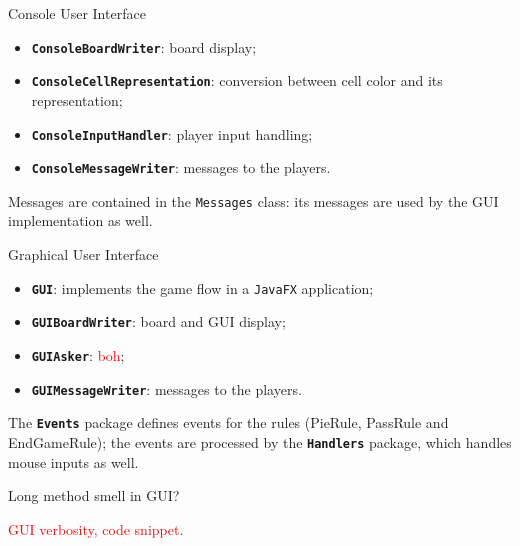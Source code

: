 \documentclass{beamer}
\begin{document}
  \begin{frame}{Console User Interface}

    \begin{itemize}
      \setlength\itemsep{1em}
      \item \textbf{\texttt{ConsoleBoardWriter}}: board display;
      \item \textbf{\texttt{ConsoleCellRepresentation}}: conversion between cell color and its representation;
      \item \textbf{\texttt{ConsoleInputHandler}}: player input handling;
      \item \textbf{\texttt{ConsoleMessageWriter}}: messages to the players.
    \end{itemize}

    \vspace{1em}

    Messages are contained in the \texttt{Messages} class: its messages are used by the GUI implementation as well.


  \end{frame}



  \begin{frame}{Graphical User Interface}

    \begin{itemize}
      \setlength\itemsep{1em}
      \item \textbf{\texttt{GUI}}: implements the game flow in a \texttt{JavaFX} application;
      \item \textbf{\texttt{GUIBoardWriter}}: board and GUI display;
      \item \textbf{\texttt{GUIAsker}}: \textcolor{red}{boh};
      \item \textbf{\texttt{GUIMessageWriter}}: messages to the players.
    \end{itemize}

    \vspace{1em}

    The \textbf{\texttt{Events}} package defines events for the rules (PieRule, PassRule and EndGameRule); the events are processed by the \textbf{\texttt{Handlers}} package, which handles mouse inputs as well.


  \end{frame}


  \begin{frame}{Long method smell in GUI?}

    \textcolor{red}{GUI verbosity, code snippet.}

  \end{frame}
\end{document}
